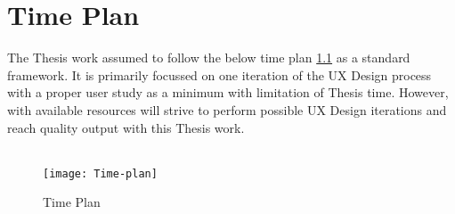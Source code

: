 \chapter{Time Plan}
\label{ch:timeplan}

The Thesis work assumed to follow the below time plan \ref{fig:time-plan} as a standard framework. It is primarily focussed on one iteration of the UX Design process with a proper user study as a minimum with limitation of Thesis time. However, with available resources will strive to perform possible UX Design iterations and reach quality output with this Thesis work. \\ \\

\begin{figure}[h]
	\texttt{[image: Time-plan]}
	\centering
	\caption{Time Plan}
	\label{fig:time-plan}
\end{figure}